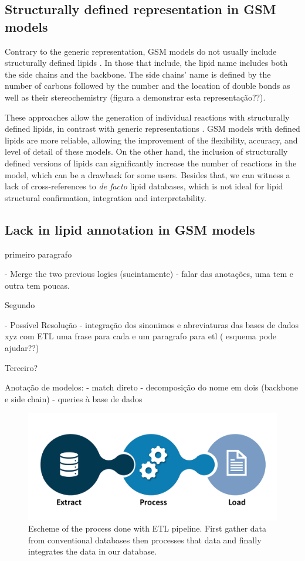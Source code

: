 \documentclass{llncs}
\begin{document}
\subsection{Structurally defined representation in GSM models}
Contrary to the generic representation, GSM models do not usually include structurally defined lipids \cite{Schutzhold}.
In those that include, the lipid name includes both the side chains and the backbone. The side chains' name is defined by the number of carbons followed by the number and the location of double bonds as well as their stereochemistry (figura a demonstrar esta representação??).

These approaches allow the generation of individual reactions with structurally defined lipids, in contrast with generic representations \cite{Aung2013}.
GSM models with defined lipids are more reliable, allowing the improvement of the flexibility, accuracy, and level of detail of these models. On the other hand, the inclusion of structurally defined versions of lipids can significantly increase the number of reactions in the model, which can be a drawback for some users.
Besides that, we can witness a lack of cross-references to \textit{de facto} lipid databases, which is not ideal for lipid structural confirmation, integration and interpretability.

\subsection{Lack in lipid annotation in GSM models}
primeiro paragrafo

- Merge the two previous logics (sucintamente)
- falar das anotações, uma tem e outra tem poucas.

Segundo

- Possível Resolução
    - integração dos sinonimos e abreviaturas das bases de dados xyz com ETL
    uma frase para cada e um paragrafo para etl ( esquema pode ajudar??)

Terceiro?   

Anotação de modelos:
    - match direto
    - decomposição do nome em dois (backbone e side chain) - queries à base de dados
\begin{figure}
    \includegraphics[width=\textwidth]{imagens/ETL.png}
    \caption{Escheme of the process done with ETL pipeline.
    First gather data from conventional databases
    then processes that data
    and finally integrates the data in our database.} \label{fig2}    
\end{figure}







\end{document}
